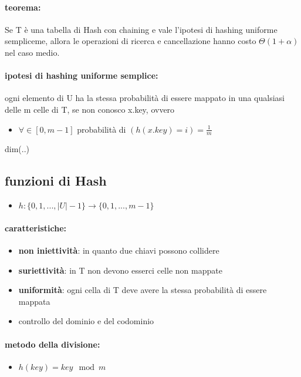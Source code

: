 \documentclass{article}
\begin{document}
\paragraph{teorema:} Se T è una tabella di Hash con chaining e vale l'ipotesi di hashing uniforme sempliceme, allora le operazioni di ricerca e cancellazione 
hanno costo $\Theta(1 + \alpha)$ nel caso medio.

\paragraph{ipotesi di hashing uniforme semplice:} ogni elemento di U ha la stessa probabilità di essere mappato in una qualsiasi delle m celle di T, se non conosco 
x.key, ovvero 
\begin{itemize}
    \item $\forall \in [0,m-1]$ probabilità di $\displaystyle (h(x.key) = i) = \frac{1}{m}  $
\end{itemize}

dim(..)

\subsection{funzioni di Hash} %
\begin{itemize}
    \item $h: \{ 0,1,...,|U|-1 \} \rightarrow \{0,1,...,m-1\}$
\end{itemize}

\paragraph{caratteristiche:}
\begin{itemize}
    \item \textbf{non iniettività}: in quanto due chiavi possono collidere
    \item \textbf{suriettività}: in T non devono esserci celle non mappate
    \item \textbf{uniformità}: ogni cella di T deve avere la stessa probabilità di essere mappata
    \item controllo del dominio e del codominio
\end{itemize}

\paragraph{metodo della divisione:}
\begin{itemize}
    \item $h(key) = key \mod m$
\end{itemize}
\end{document}
